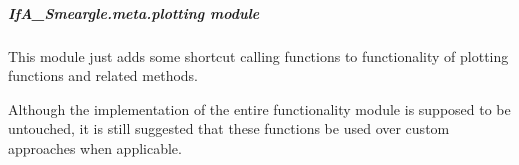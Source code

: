 \documentclass[letterpaper,10pt,english]{sphinxmanual}
\begin{document}
\subparagraph{IfA\_Smeargle.meta.plotting module}
\label{\detokenize{python_docstrings/IfA_Smeargle.meta.plotting:module-IfA_Smeargle.meta.plotting}}\label{\detokenize{python_docstrings/IfA_Smeargle.meta.plotting:ifa-smeargle-meta-plotting-module}}\label{\detokenize{python_docstrings/IfA_Smeargle.meta.plotting::doc}}
This module just adds some shortcut calling functions to functionality of plotting functions
and related methods.

Although the implementation of the entire functionality module is supposed to be untouched,
it is still suggested that these functions be used over custom approaches when applicable.
\end{document}
